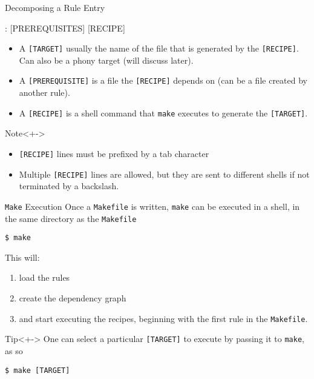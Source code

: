 \documentclass[10pt]{beamer}
\newcommand{\textco}[1]{\colorbox{bg_gray}{\texttt{#1}}}
\begin{document}
\begin{frame}[fragile]{Decomposing a Rule Entry}
\begin{makefile}
[TARGET]: [PREREQUISITES]
    [RECIPE]
\end{makefile}
  \begin{itemize}
    \item<+-> A \textco{[TARGET]} usually the name of the file that is generated by
      the \textco{[RECIPE]}. Can also be a phony target (will discuss later).\\

    \item<+-> A \textco{[PREREQUISITE]} is a file the \textco{[RECIPE]} depends
      on (can be a file created by another rule).\\

    \item<+-> A \textco{[RECIPE]} is a shell command that \textco{make} executes
      to generate the \textco{[TARGET]}.

  \end{itemize}

  \begin{alertblock}{Note}<+->
    \begin{itemize}
    \item \textco{[RECIPE]} lines must be prefixed by a tab character
    \item Multiple \textco{[RECIPE]} lines are allowed, but they are sent to different shells if
        not terminated by a backslash.
    \end{itemize}
  \end{alertblock}
\end{frame}


\begin{frame}[fragile]{\texttt{Make} Execution}
  Once a \textco{Makefile} is written, \textco{make} can be executed in a shell,
  in the same directory as the \textco{Makefile}
  \begin{lstlisting}
$ make
\end{lstlisting}
  This will:
  \begin{enumerate}[<+->]
  \item load the rules
  \item create the dependency graph
    \item and start executing the
      recipes, beginning with the first rule in the \textco{Makefile}.
    \end{enumerate}

  \begin{exampleblock}{Tip}<+->
  One can select a particular \textco{[TARGET]} to execute by passing it to
  \textco{make}, as so
\begin{lstlisting}
$ make [TARGET]
\end{lstlisting}
\end{exampleblock}

\end{frame}
\end{document}
